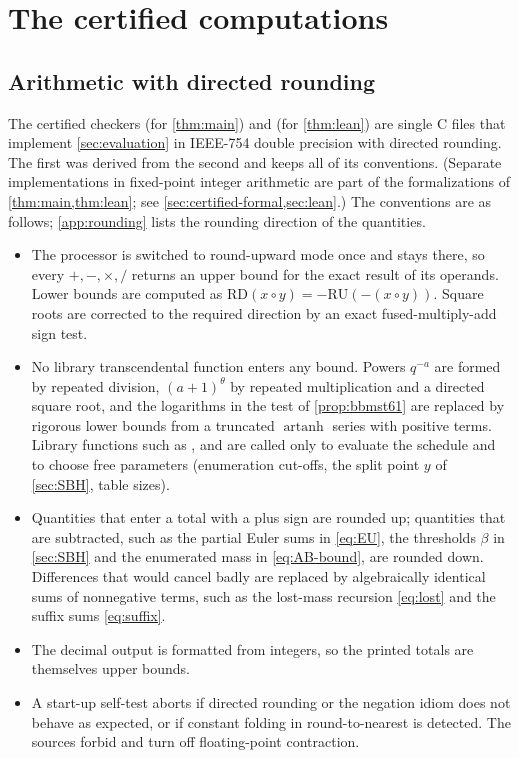 \section{The certified computations}\label{sec:computation}

\subsection{Arithmetic with directed rounding}\label{sec:rounding}

The certified checkers  (for \cref{thm:main}) and  (for
\cref{thm:lean}) are single C files that implement \cref{sec:evaluation} in IEEE-754 double precision with directed
rounding. The first was derived from the second and keeps all of its conventions. (Separate implementations in
fixed-point integer arithmetic are part of the formalizations of \cref{thm:main,thm:lean}; see
\cref{sec:certified-formal,sec:lean}.) The conventions
are as follows; \cref{app:rounding} lists the rounding direction of the quantities.
\begin{itemize}
\item The processor is switched to round-upward mode once and stays there, so every $+,-,\times,/$ returns an
  upper bound for the exact result of its operands. Lower bounds are computed as
  $\mathrm{RD}(x\circ y)=-\mathrm{RU}(-(x\circ y))$. Square roots are corrected to the required direction by an
  exact fused-multiply-add sign test.
\item No library transcendental function enters any bound. Powers $q^{-a}$ are formed by repeated division,
  $(a+1)^\theta$ by repeated multiplication and a directed square root, and the logarithms in the test of
  \cref{prop:bbmst61} are replaced by rigorous lower bounds from a truncated $\operatorname{artanh}$ series with
  positive terms. Library functions such as ,  and  are called only to evaluate the
  schedule and to choose free parameters (enumeration cut-offs, the split point $y$ of \cref{sec:SBH}, table sizes).
\item Quantities that enter a total with a plus sign are rounded up; quantities that are subtracted, such as the
  partial Euler sums in \eqref{eq:EU}, the thresholds $\beta$ in \cref{sec:SBH} and the enumerated mass in
  \eqref{eq:AB-bound}, are rounded down. Differences that would cancel badly are replaced by algebraically identical
  sums of nonnegative terms, such as the lost-mass recursion \eqref{eq:lost} and the suffix sums \eqref{eq:suffix}.
\item The decimal output is formatted from integers, so the printed totals are themselves upper bounds.
\item A start-up self-test aborts if directed rounding or the negation idiom does not behave as expected, or if
  constant folding in round-to-nearest is detected. The sources forbid  and turn off
  floating-point contraction.
\end{itemize}

